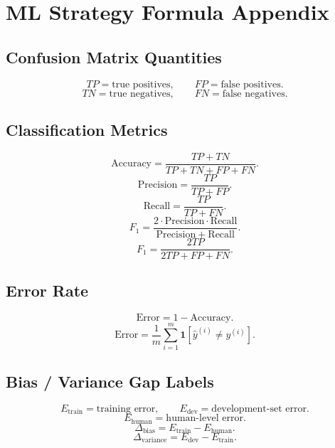 \section{ML Strategy Formula Appendix}

\subsection{Confusion Matrix Quantities}

\[
TP=\text{true positives},
\qquad
FP=\text{false positives}.
\]
\[
TN=\text{true negatives},
\qquad
FN=\text{false negatives}.
\]

\subsection{Classification Metrics}

\[
\mathrm{Accuracy}
=
\frac{TP+TN}{TP+TN+FP+FN}.
\]
\[
\mathrm{Precision}
=
\frac{TP}{TP+FP}.
\]
\[
\mathrm{Recall}
=
\frac{TP}{TP+FN}.
\]
\[
F_1
=
\frac{2\cdot \mathrm{Precision}\cdot \mathrm{Recall}}
{\mathrm{Precision}+\mathrm{Recall}}.
\]
\[
F_1
=
\frac{2TP}{2TP+FP+FN}.
\]

\subsection{Error Rate}

\[
\mathrm{Error}
=
1-\mathrm{Accuracy}.
\]
\[
\mathrm{Error}
=
\frac{1}{m}
\sum_{i=1}^{m}
\mathbf{1}
\left[
\hat{y}^{(i)} \neq y^{(i)}
\right].
\]

\subsection{Bias / Variance Gap Labels}

\[
E_{\mathrm{train}}=\text{training error},
\qquad
E_{\mathrm{dev}}=\text{development-set error}.
\]
\[
E_{\mathrm{human}}=\text{human-level error}.
\]
\[
\Delta_{\mathrm{bias}}
=
E_{\mathrm{train}}-E_{\mathrm{human}}.
\]
\[
\Delta_{\mathrm{variance}}
=
E_{\mathrm{dev}}-E_{\mathrm{train}}.
\]

